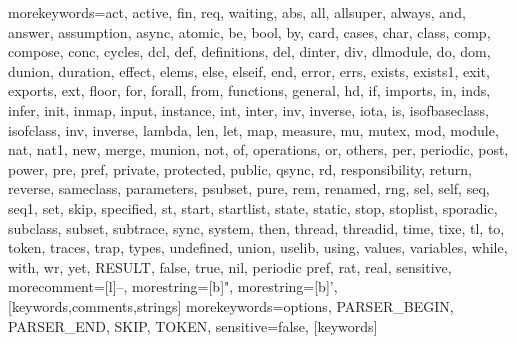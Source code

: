   {morekeywords={act, active, fin, req, waiting, abs, all, allsuper, always, and, answer, 
     assumption, async, atomic, be, bool, by, card, cases, char, class, comp, compose, conc, cycles,
     dcl, def, definitions, del, dinter, div, dlmodule, do, dom, dunion, duration, effect, elems, else, elseif, end,
     error, errs, exists, exists1, exit, exports, ext, floor, for, forall, from, functions, 
     general, hd, if, imports, in, inds, infer, init, inmap, input, instance, int, inter, inv, inverse, iota, is, 
     isofbaseclass, isofclass, inv, inverse, lambda, len, let, map, measure, mu,
     mutex, mod, module, nat, nat1, new, merge, 
     munion, not, of, operations, or, others, per, periodic, post, power, pre, pref, 
     private, protected, public, qsync, rd, responsibility, return, reverse,  
     sameclass, parameters, psubset, pure, rem, renamed, rng, sel, self, seq, seq1, set, skip, specified, st, 
     start, startlist, state, static, stop, stoplist, sporadic, subclass, subset, subtrace, sync, system, then, thread, 
     threadid, time, tixe, tl, to, token, traces, trap, types, undefined,
     union, uselib, using, values, 
     variables, while, with, wr, yet, RESULT, false, true, nil, periodic pref, rat, real},
   sensitive,
   morecomment=[l]--,
   morestring=[b]",
   morestring=[b]',
  }[keywords,comments,strings]
  {morekeywords={options, PARSER\_BEGIN, PARSER\_END, SKIP, TOKEN},
   sensitive=false,
  }[keywords]
